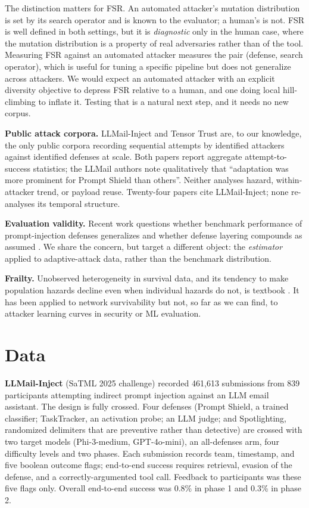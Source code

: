 \documentclass[conference]{IEEEtran}
\begin{document}
The distinction matters for FSR. An automated attacker's mutation distribution is set by its search operator and is known to the evaluator; a human's is not. FSR is well defined in both settings, but it is \textit{diagnostic} only in the human case, where the mutation distribution is a property of real adversaries rather than of the tool. Measuring FSR against an automated attacker measures the pair (defense, search operator), which is useful for tuning a specific pipeline but does not generalize across attackers. We would expect an automated attacker with an explicit diversity objective to depress FSR relative to a human, and one doing local hill-climbing to inflate it. Testing that is a natural next step, and it needs no new corpus.

\textbf{Public attack corpora.} LLMail-Inject \cite{llmail} and Tensor Trust \cite{tensortrust} are, to our knowledge, the only public corpora recording sequential attempts by identified attackers against identified defenses at scale. Both papers report aggregate attempt-to-success statistics; the LLMail authors note qualitatively that ``adaptation was more prominent for Prompt Shield than others''. Neither analyses hazard, within-attacker trend, or payload reuse. Twenty-four papers cite LLMail-Inject; none re-analyses its temporal structure.

\textbf{Evaluation validity.} Recent work questions whether benchmark performance of prompt-injection defenses generalizes \cite{benchmarksLie,surfaceHeuristics} and whether defense layering compounds as assumed \cite{layeredDefenses}. We share the concern, but target a different object: the \textit{estimator} applied to adaptive-attack data, rather than the benchmark distribution.

\textbf{Frailty.} Unobserved heterogeneity in survival data, and its tendency to make population hazards decline even when individual hazards do not, is textbook \cite{balanputter,vaupel}. It has been applied to network survivability \cite{ma2011frailty} but not, so far as we can find, to attacker learning curves in security or ML evaluation.


\section{Data}

\textbf{LLMail-Inject} (SaTML 2025 challenge) recorded 461,613 submissions from 839 participants attempting indirect prompt injection against an LLM email assistant. The design is fully crossed. Four defenses (Prompt Shield, a trained classifier; TaskTracker, an activation probe; an LLM judge; and Spotlighting, randomized delimiters that are preventive rather than detective) are crossed with two target models (Phi-3-medium, GPT-4o-mini), an all-defenses arm, four difficulty levels and two phases. Each submission records team, timestamp, and five boolean outcome flags; end-to-end success requires retrieval, evasion of the defense, and a correctly-argumented tool call. Feedback to participants was these five flags only. Overall end-to-end success was 0.8\% in phase 1 and 0.3\% in phase 2.
\end{document}
